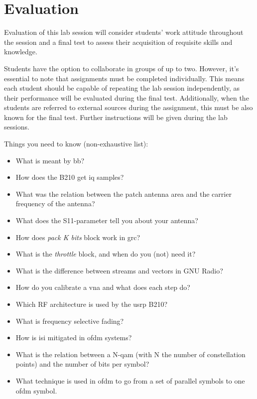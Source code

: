 \chapter{Evaluation}\glsresetall

Evaluation of this lab session will consider students' work attitude throughout the session and a final test to assess their acquisition of requisite skills and knowledge.

Students have the option to collaborate in groups of up to two. However, it's essential to note that assignments must be completed individually. This means each student should be capable of repeating the lab session independently, as their performance will be evaluated during the final test. Additionally, when the students are referred to external sources during the assignment, this must be also known for the final test.
Further instructions will be given during the lab sessions.

Things you need to know (non-exhaustive list):
\begin{itemize}
    \item What is meant by \gls{bb}?
    \item How does the B210 get \gls{iq} samples?
    \item What was the relation between the patch antenna area and the carrier frequency of the antenna?
    \item What does the S11-parameter tell you about your antenna?
    \item How does \textit{pack K bits} block work in \gls{grc}?
    \item What is the \textit{throttle} block, and when do you (not) need it?
    \item What is the difference between streams and vectors in GNU Radio?
    \item How do you calibrate a \gls{vna} and what does each step do?
    \item Which RF architecture is used by the \gls{usrp} B210?
    \item What is frequency selective fading?
    \item How is \gls{isi} mitigated in \gls{ofdm} systems?
    \item What is the relation between a N-\gls{qam} (with N the number of constellation points) and the number of bits per symbol?
    \item What technique is used in \gls{ofdm} to go from a set of parallel symbols to one \gls{ofdm} symbol.  
\end{itemize}

